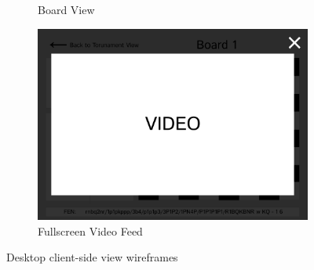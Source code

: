 \begin{figure}[h!]
\begin{subfigure}[h!]{0.40\linewidth}
        \caption{Board View}
        \label{fig:desktop-board-view}
    \end{subfigure}

    \begin{subfigure}[h!]{0.40\linewidth}
        \centering
        \includegraphics[width=\linewidth]{figures/methods/wireframes/desktop-full-screen-video-view.png}
        \caption{Fullscreen Video Feed}
        \label{fig:desktop-fullscreen-video}
    \end{subfigure}
    
    \caption{Desktop client-side view wireframes}
    \label{fig:desktop-view-group}
\end{figure}


